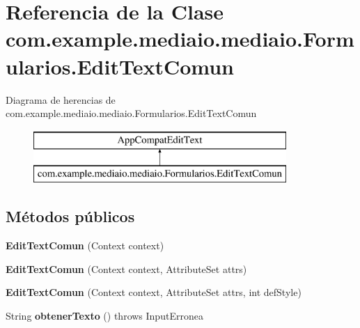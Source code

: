 \hypertarget{classcom_1_1example_1_1mediaio_1_1mediaio_1_1_formularios_1_1_edit_text_comun}{}\section{Referencia de la Clase com.\+example.\+mediaio.\+mediaio.\+Formularios.\+Edit\+Text\+Comun}
\label{classcom_1_1example_1_1mediaio_1_1mediaio_1_1_formularios_1_1_edit_text_comun}
Diagrama de herencias de com.\+example.\+mediaio.\+mediaio.\+Formularios.\+Edit\+Text\+Comun\begin{figure}[H]
\begin{center}
\leavevmode
\includegraphics[height=2.000000cm]{classcom_1_1example_1_1mediaio_1_1mediaio_1_1_formularios_1_1_edit_text_comun}
\end{center}
\end{figure}
\subsection*{Métodos públicos}
\begin{DoxyCompactItemize}
\item 
\mbox{\label{classcom_1_1example_1_1mediaio_1_1mediaio_1_1_formularios_1_1_edit_text_comun_a6540ab7d52b91de4b10ba70797bd3620}} 
{\bfseries Edit\+Text\+Comun} (Context context)
\item 
\mbox{\label{classcom_1_1example_1_1mediaio_1_1mediaio_1_1_formularios_1_1_edit_text_comun_ab703d109f9aad8c2f986b82dce737781}} 
{\bfseries Edit\+Text\+Comun} (Context context, Attribute\+Set attrs)
\item 
\mbox{\label{classcom_1_1example_1_1mediaio_1_1mediaio_1_1_formularios_1_1_edit_text_comun_a41ec48b6e34c5d643d585fe1fd510584}} 
{\bfseries Edit\+Text\+Comun} (Context context, Attribute\+Set attrs, int def\+Style)
\item 
\mbox{\label{classcom_1_1example_1_1mediaio_1_1mediaio_1_1_formularios_1_1_edit_text_comun_ab18dd4b107978146c636eb586f0710d7}} 
String {\bfseries obtener\+Texto} ()  throws Input\+Erronea     
\end{DoxyCompactItemize}


